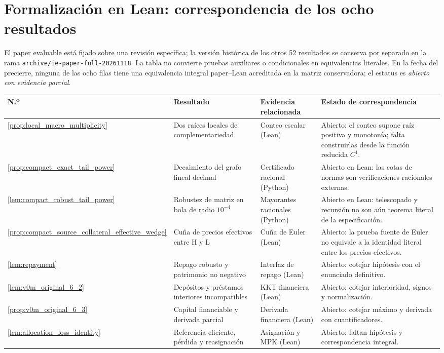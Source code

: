 \section{Formalización en Lean: correspondencia de los ocho resultados}
\label{app:compact_lean_matrix}
El paper evaluable está fijado sobre una revisión específica;
la versión histórica de los otros 52 resultados se conserva
por separado en la rama
\texttt{archive/ie-paper-full-20261118}. La tabla no convierte
pruebas auxiliares o condicionales en equivalencias literales.
En la fecha del precierre, ninguna de las ocho filas tiene
una equivalencia integral paper--Lean acreditada en la matriz
conservadora; el estatus es \emph{abierto con evidencia parcial}.

\begingroup\small
\setlength{\tabcolsep}{3pt}
\renewcommand{\arraystretch}{1.2}
\begin{longtable}{@{}p{1.05cm}p{4.0cm}p{3.1cm}p{5.8cm}@{}}
\toprule
N.º & Resultado & Evidencia relacionada & Estado de correspondencia\\\midrule\endhead
\ref{prop:local_macro_multiplicity} &
Dos raíces locales de complementariedad &
Conteo escalar (Lean) &
Abierto: el conteo supone raíz positiva y monotonía;
falta construirlas desde la función reducida $C^1$.\\
\ref{prop:compact_exact_tail_power} &
Decaimiento del grafo lineal decimal &
Certificado racional (Python) &
Abierto en Lean: las cotas de normas son verificaciones
racionales externas.\\
\ref{lem:compact_robust_tail_power} &
Robustez de matriz en bola de radio $10^{-4}$ &
Mayorantes racionales (Python) &
Abierto en Lean: telescopado y recursión no son aún
teorema literal de la especificación.\\
\ref{prop:compact_source_collateral_effective_wedge} &
Cuña de precios efectivos entre H y L &
Cuña de Euler (Lean) &
Abierto: la prueba fuente de Euler no equivale a la
identidad literal entre los precios efectivos.\\
\ref{lem:repayment} &
Repago robusto y patrimonio no negativo &
Interfaz de repago (Lean) &
Abierto: cotejar hipótesis con el enunciado definitivo.\\
\ref{lem:v0m_original_6_2} &
Depósitos y préstamos interiores incompatibles &
KKT financiera (Lean) &
Abierto: cotejar interioridad, signos y normalización.\\
\ref{prop:v0m_original_6_3} &
Capital financiable y derivada parcial &
Derivada financiera (Lean) &
Abierto: cotejar máximo y derivada con cuantificadores.\\
\ref{lem:allocation_loss_identity} &
Referencia eficiente, pérdida y reasignación &
Asignación y MPK (Lean) &
Abierto: faltan hipótesis y correspondencia integral.\\
\bottomrule
\end{longtable}
